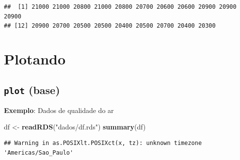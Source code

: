 \documentclass[]{book}
\newenvironment{Shaded}{\begin{snugshade}}{\end{snugshade}}
\newcommand{\KeywordTok}[1]{\textcolor[rgb]{0.13,0.29,0.53}{\textbf{#1}}}
\newcommand{\StringTok}[1]{\textcolor[rgb]{0.31,0.60,0.02}{#1}}
\newcommand{\NormalTok}[1]{#1}
\theoremstyle{definition}
\theoremstyle{definition}
\theoremstyle{definition}
\theoremstyle{remark}
\begin{document}
\begin{verbatim}
##  [1] 21000 21000 20800 21000 20800 20700 20600 20600 20900 20900 20900
## [12] 20900 20700 20500 20500 20400 20500 20700 20400 20300
\end{verbatim}

\chapter{Plotando}\label{plotando}

\section{\texorpdfstring{\texttt{plot}
(base)}{plot (base)}}\label{plot-base}

\textbf{Exemplo}: Dados de qualidade do ar

\begin{Shaded}
\begin{Highlighting}[]
\NormalTok{df <-}\StringTok{ }\KeywordTok{readRDS}\NormalTok{(}\StringTok{"dados/df.rds"}\NormalTok{)}
\KeywordTok{summary}\NormalTok{(df)}
\end{Highlighting}
\end{Shaded}

\begin{verbatim}
## Warning in as.POSIXlt.POSIXct(x, tz): unknown timezone 'Americas/Sao_Paulo'
\end{verbatim}
\end{document}
